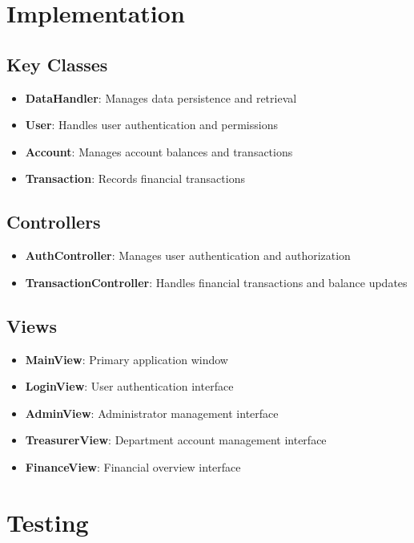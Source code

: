 \documentclass[a4paper,11pt]{article}
\begin{document}
\section{Implementation}

\subsection{Key Classes}
\begin{itemize}
\item \textbf{DataHandler}: Manages data persistence and retrieval
\item \textbf{User}: Handles user authentication and permissions
\item \textbf{Account}: Manages account balances and transactions
\item \textbf{Transaction}: Records financial transactions
\end{itemize}

\subsection{Controllers}
\begin{itemize}
\item \textbf{AuthController}: Manages user authentication and authorization
\item \textbf{TransactionController}: Handles financial transactions and balance updates
\end{itemize}

\subsection{Views}
\begin{itemize}
\item \textbf{MainView}: Primary application window
\item \textbf{LoginView}: User authentication interface
\item \textbf{AdminView}: Administrator management interface
\item \textbf{TreasurerView}: Department account management interface
\item \textbf{FinanceView}: Financial overview interface
\end{itemize}

\section{Testing}
\end{document}
